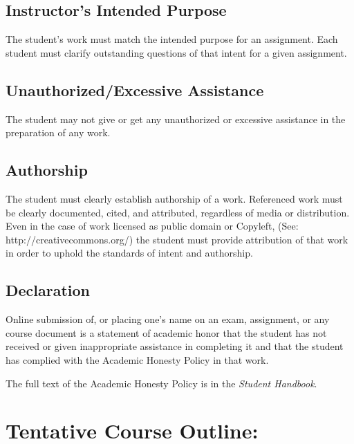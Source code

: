 \documentclass[11pt]{article}
\begin{document}
\subsection*{Instructor's Intended Purpose}
\label{sec:honesty-purp}

The student's work must match the intended purpose for an
assignment. Each student must clarify outstanding questions of that
intent for a given assignment.

\subsection*{Unauthorized/Excessive Assistance}
\label{sec:honest-assist}

The student may not give or get any unauthorized or excessive
assistance in the preparation of any work.

\subsection*{Authorship}
\label{sec:honesty-auth}

The student must clearly establish authorship of a work. Referenced
work must be clearly documented, cited, and attributed, regardless of
media or distribution. Even in the case of work licensed as public
domain or Copyleft, (See: http://creativecommons.org/) the student
must provide attribution of that work in order to uphold the standards
of intent and authorship.

\subsection*{Declaration}
\label{sec:honesty-dec}

Online submission of, or placing one's name on an exam, assignment, or
any course document is a statement of academic honor that the student
has not received or given inappropriate assistance in completing it
and that the student has complied with the Academic Honesty Policy in
that work.

The full text of the Academic Honesty Policy is in the \emph{Student
  Handbook}.

\section*{Tentative Course Outline:}
\label{sec:outline}
\end{document}
